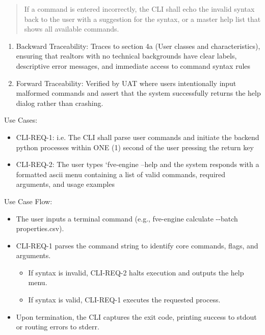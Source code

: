 \begin{quote}
If a command is entered incorrectly, the CLI shall echo the invalid
syntax back to the user with a suggestion for the syntax, or a master
help list that shows all available commands.
\end{quote}

\begin{enumerate}
\def\labelenumi{\alph{enumi}.}
\setcounter{enumi}{1}
\item
  Backward Traceability: Traces to section 4a (User classes and
  characteristics), ensuring that realtors with no technical backgrounds
  have clear labels, descriptive error messages, and immediate access to
  command syntax rules
\item
  Forward Traceability: Verified by UAT where users intentionally input
  malformed commands and assert that the system successfully returns the
  help dialog rather than crashing.
\end{enumerate}

Use Cases:

\begin{itemize}
\item
  CLI-REQ-1: i.e. The CLI shall parse user commands and initiate the
  backend python processes within ONE (1) second of the user pressing
  the return key
\item
  CLI-REQ-2: The user types `fve-engine --help\textquotesingle{} and the
  system responds with a formatted ascii menu containing a list of valid
  commands, required arguments, and usage examples
\end{itemize}

Use Case Flow:

\begin{itemize}
\item
  The user inputs a terminal command (e.g., fve-engine calculate
  -\/-batch properties.csv).
\item
  CLI-REQ-1 parses the command string to identify core commands, flags,
  and arguments.

  \begin{itemize}
  \item
    If syntax is invalid, CLI-REQ-2 halts execution and outputs the help
    menu.
  \item
    If syntax is valid, CLI-REQ-1 executes the requested process.
  \end{itemize}
\item
  Upon termination, the CLI captures the exit code, printing success to
  stdout or routing errors to stderr.
\end{itemize}

